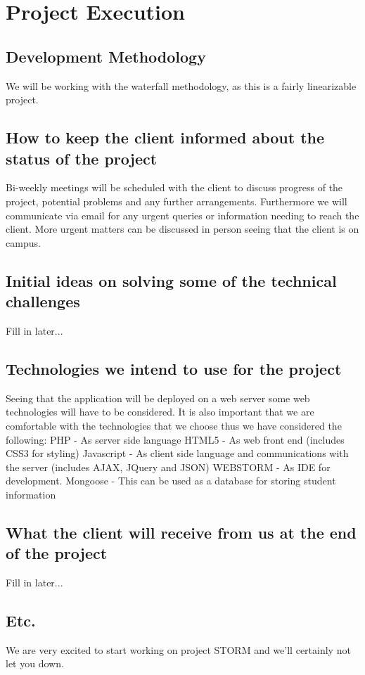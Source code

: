 \documentclass[12pt, oneside]{article}
\begin{document}
\section{Project Execution}
	\subsection{Development Methodology}
		We will be working with the waterfall methodology, as this is a fairly linearizable project.
	\subsection{How to keep the client informed about the status of the project}
		Bi-weekly meetings will be scheduled with the client to discuss progress of the project, potential problems and any further arrangements. Furthermore we will communicate via email for any urgent queries or information needing to reach the client. More urgent matters can be discussed in person seeing that the client is on campus. 
	\subsection{Initial ideas on solving some of the technical challenges}
		Fill in later...
	\subsection{Technologies we intend to use for the project}
		Seeing that the application will be deployed on a web server some web technologies will have to be considered.
		It is also important that we are comfortable with the technologies that we choose thus we have considered the following:\newline
		PHP - As server side language\newline
		HTML5 - As web front end (includes CSS3 for styling)\newline
		Javascript - As client side language and communications with the server (includes AJAX, JQuery and JSON)
		WEBSTORM - As IDE for development.
		Mongoose - This can be used as a database for storing student information
	\subsection{What the client will receive from us at the end of the project}
		Fill in later...
	\subsection{Etc.}
		We are very excited to start working on project STORM and we'll certainly not let you down.
\end{document}

